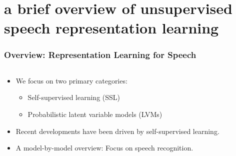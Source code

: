 
\section{a brief overview of unsupervised speech representation learning}


\begin{frame}
    \frametitle{Overview: Representation Learning for Speech}

    \begin{columns}

        \begin{column}{0.4\textwidth}
            \begin{itemize}
                \item We focus on two primary categories:
                \begin{itemize}
                    \item Self-supervised learning (SSL)
                    \item Probabilistic latent variable models (LVMs)
                \end{itemize}
                \item Recent developments have been driven by self-supervised learning.
                \item A model-by-model overview: Focus on speech recognition.
            \end{itemize}
        \end{column}

        \begin{column}{0.6\textwidth}


\end{column}
\end{columns}
\end{frame}
